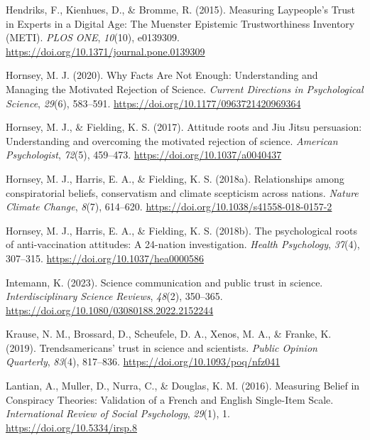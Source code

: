 \documentclass[
  doc,floatsintext]{apa6}
\newlength{\cslhangindent}
\newenvironment{CSLReferences}[2] %
 {\begin{list}{}{%
  \setlength{\itemindent}{0pt}
  \setlength{\leftmargin}{0pt}
  \setlength{\parsep}{0pt}
  \ifodd #1
   \setlength{\leftmargin}{\cslhangindent}
   \setlength{\itemindent}{-1\cslhangindent}
  \fi
  \setlength{\itemsep}{#2\baselineskip}}}
 {\end{list}}
\begin{document}
\begin{CSLReferences}{1}{0}
Hendriks, F., Kienhues, D., \& Bromme, R. (2015). Measuring Laypeople{'}s Trust in Experts in a Digital Age: The Muenster Epistemic Trustworthiness Inventory (METI). \emph{PLOS ONE}, \emph{10}(10), e0139309. \url{https://doi.org/10.1371/journal.pone.0139309}

Hornsey, M. J. (2020). Why Facts Are Not Enough: Understanding and Managing the Motivated Rejection of Science. \emph{Current Directions in Psychological Science}, \emph{29}(6), 583--591. \url{https://doi.org/10.1177/0963721420969364}

Hornsey, M. J., \& Fielding, K. S. (2017). Attitude roots and Jiu Jitsu persuasion: Understanding and overcoming the motivated rejection of science. \emph{American Psychologist}, \emph{72}(5), 459--473. \url{https://doi.org/10.1037/a0040437}

Hornsey, M. J., Harris, E. A., \& Fielding, K. S. (2018a). Relationships among conspiratorial beliefs, conservatism and climate scepticism across nations. \emph{Nature Climate Change}, \emph{8}(7), 614--620. \url{https://doi.org/10.1038/s41558-018-0157-2}

Hornsey, M. J., Harris, E. A., \& Fielding, K. S. (2018b). The psychological roots of anti-vaccination attitudes: A 24-nation investigation. \emph{Health Psychology}, \emph{37}(4), 307--315. \url{https://doi.org/10.1037/hea0000586}

Intemann, K. (2023). Science communication and public trust in science. \emph{Interdisciplinary Science Reviews}, \emph{48}(2), 350--365. \url{https://doi.org/10.1080/03080188.2022.2152244}

Krause, N. M., Brossard, D., Scheufele, D. A., Xenos, M. A., \& Franke, K. (2019). Trends{\textemdash}americans{'} trust in science and scientists. \emph{Public Opinion Quarterly}, \emph{83}(4), 817--836. \url{https://doi.org/10.1093/poq/nfz041}

Lantian, A., Muller, D., Nurra, C., \& Douglas, K. M. (2016). Measuring Belief in Conspiracy Theories: Validation of a French and English Single-Item Scale. \emph{International Review of Social Psychology}, \emph{29}(1), 1. \url{https://doi.org/10.5334/irsp.8}


\end{CSLReferences}
\end{document}
